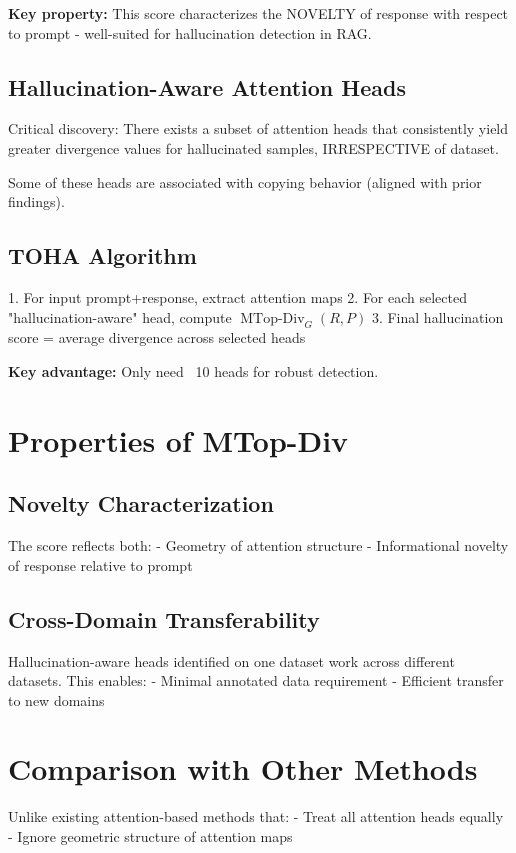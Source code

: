\textbf{Key property:} This score characterizes the NOVELTY of response with respect to prompt - well-suited for hallucination detection in RAG.

\subsection{Hallucination-Aware Attention Heads}
Critical discovery: There exists a subset of attention heads that consistently yield greater divergence values for hallucinated samples, IRRESPECTIVE of dataset.

Some of these heads are associated with copying behavior (aligned with prior findings).

\subsection{TOHA Algorithm}
1. For input prompt+response, extract attention maps
2. For each selected "hallucination-aware" head, compute $\operatorname{MTop-Div}_G(R, P)$
3. Final hallucination score = average divergence across selected heads

\textbf{Key advantage:} Only need ~10 heads for robust detection.

\section{Properties of MTop-Div}

\subsection{Novelty Characterization}
The score reflects both:
- Geometry of attention structure
- Informational novelty of response relative to prompt

\subsection{Cross-Domain Transferability}
Hallucination-aware heads identified on one dataset work across different datasets. This enables:
- Minimal annotated data requirement
- Efficient transfer to new domains

\section{Comparison with Other Methods}

Unlike existing attention-based methods that:
- Treat all attention heads equally
- Ignore geometric structure of attention maps


